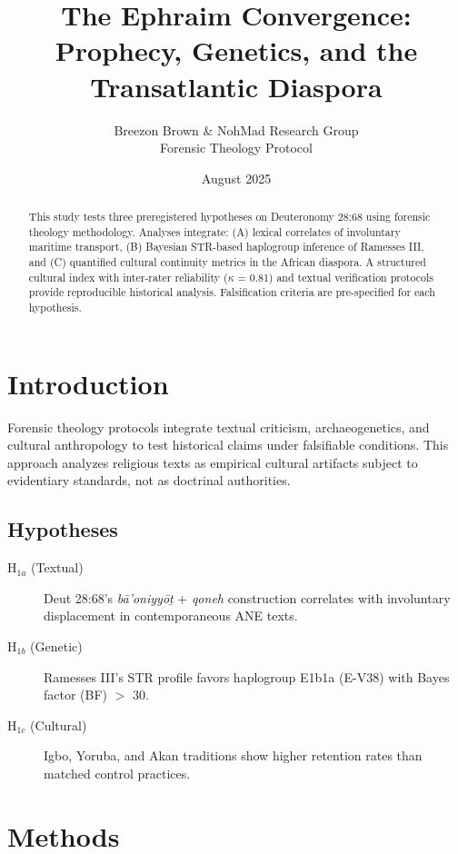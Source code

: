 \documentclass[11pt]{article}
\title{\textbf{The Ephraim Convergence: Prophecy, Genetics, and the Transatlantic Diaspora}}
\author{Breezon Brown \& NohMad Research Group \\ \small{Forensic Theology Protocol}}
\date{August 2025}
\begin{document}
\maketitle
\listoffigures
\doublespacing
\setlength{\emergencystretch}{3em} %

\begin{abstract}
This study tests three preregistered hypotheses on Deuteronomy 28:68 using forensic theology methodology. Analyses integrate: (A) lexical correlates of involuntary maritime transport, (B) Bayesian STR-based haplogroup inference of Ramesses III, and (C) quantified cultural continuity metrics in the African diaspora. A structured cultural index with inter-rater reliability ($\kappa$ = 0.81) and textual verification protocols provide reproducible historical analysis. Falsification criteria are pre-specified for each hypothesis.
\end{abstract}

\section{Introduction}
Forensic theology protocols integrate textual criticism, archaeogenetics, and cultural anthropology to test historical claims under falsifiable conditions. This approach analyzes religious texts as empirical cultural artifacts subject to evidentiary standards, not as doctrinal authorities.

\subsection{Hypotheses}
\begin{description}
    \item[H$_{1a}$ (Textual)] Deut 28:68's \textit{bā’oniyyōṯ} + \textit{qoneh} construction correlates with involuntary displacement in contemporaneous ANE texts.
    \item[H$_{1b}$ (Genetic)] Ramesses III’s STR profile favors haplogroup E1b1a (E-V38) with Bayes factor (BF) $>$ 30.
    \item[H$_{1c}$ (Cultural)] Igbo, Yoruba, and Akan traditions show higher retention rates than matched control practices.
\end{description}

\section{Methods}
\end{document}
